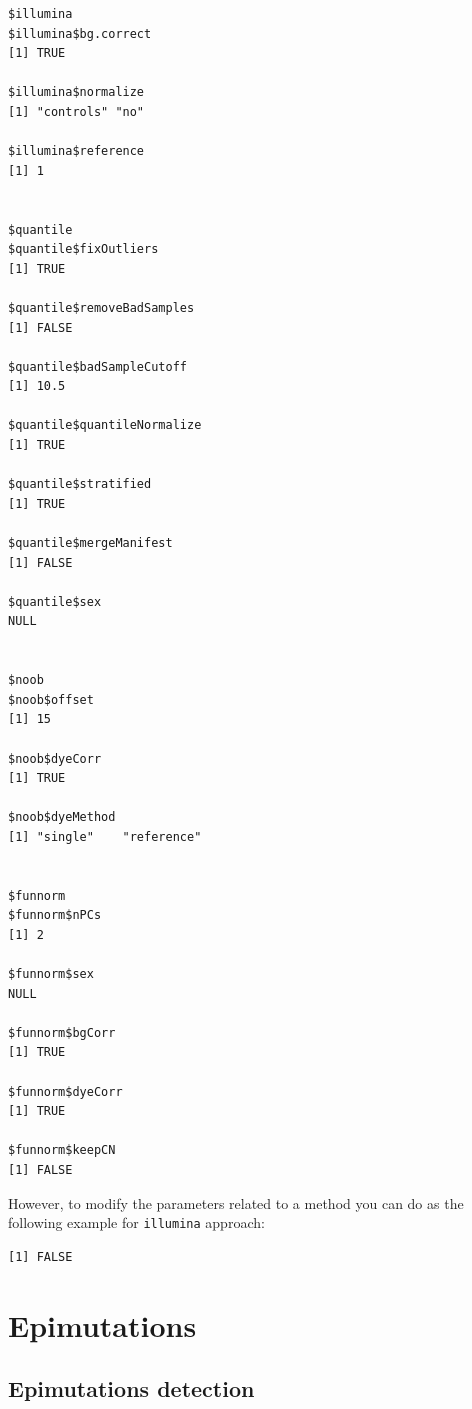 \documentclass[
]{article}
\newenvironment{Shaded}{\begin{snugshade}}{\end{snugshade}}
\newcommand{\DataTypeTok}[1]{\textcolor[rgb]{0.13,0.29,0.53}{#1}}
\newcommand{\KeywordTok}[1]{\textcolor[rgb]{0.13,0.29,0.53}{\textbf{#1}}}
\newcommand{\NormalTok}[1]{#1}
\newcommand{\OperatorTok}[1]{\textcolor[rgb]{0.81,0.36,0.00}{\textbf{#1}}}
\newcommand{\OtherTok}[1]{\textcolor[rgb]{0.56,0.35,0.01}{#1}}
\newcommand{\StringTok}[1]{\textcolor[rgb]{0.31,0.60,0.02}{#1}}
\begin{document}
\begin{verbatim}
$illumina
$illumina$bg.correct
[1] TRUE

$illumina$normalize
[1] "controls" "no"      

$illumina$reference
[1] 1


$quantile
$quantile$fixOutliers
[1] TRUE

$quantile$removeBadSamples
[1] FALSE

$quantile$badSampleCutoff
[1] 10.5

$quantile$quantileNormalize
[1] TRUE

$quantile$stratified
[1] TRUE

$quantile$mergeManifest
[1] FALSE

$quantile$sex
NULL


$noob
$noob$offset
[1] 15

$noob$dyeCorr
[1] TRUE

$noob$dyeMethod
[1] "single"    "reference"


$funnorm
$funnorm$nPCs
[1] 2

$funnorm$sex
NULL

$funnorm$bgCorr
[1] TRUE

$funnorm$dyeCorr
[1] TRUE

$funnorm$keepCN
[1] FALSE
\end{verbatim}

However, to modify the parameters related to a method you can do as the
following example for \texttt{illumina} approach:

\begin{Shaded}
\end{Shaded}

\begin{verbatim}
[1] FALSE
\end{verbatim}

\hypertarget{epimutations}{%
\section{Epimutations}\label{epimutations}}

\hypertarget{epimutations-detection}{%
\subsection{Epimutations detection}\label{epimutations-detection}}
\end{document}
